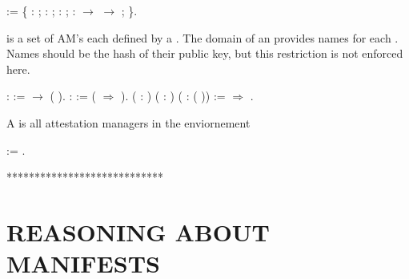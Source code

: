 \documentclass[12pt]{report}
\begin{document}
\begin{coqdoccode}
\coqdocnoindent
{}  := \{\coqdoceol
\coqdocnoindent
\coqdoceol
\coqdocindent{1.50em}
 :   ;\coqdoceol
\coqdocindent{1.50em}
 :   ; \coqdoceol
\coqdocindent{1.50em}
 :   ; \coqdoceol
\coqdocindent{1.50em}
 :  \ensuremath{\rightarrow}  \ensuremath{\rightarrow}  ;\coqdoceol
\coqdocnoindent
\coqdoceol
\coqdocnoindent
\coqdoceol
\coqdocindent{0.50em}
\}.\coqdoceol
\coqdocemptyline
\end{coqdoccode}
 is a set of AM's each defined by a .
  The domain of an  provides names for each .
  Names should be the hash of their public key, but this restriction
  is not enforced here. 

\begin{coqdoccode}
\coqdocemptyline
\coqdocnoindent
{}  :  :=   \ensuremath{\rightarrow} ( ).\coqdoceol
\coqdocemptyline
\coqdocnoindent
{}  :  := ( \coqdocvar{\_} \ensuremath{\Rightarrow} ).\coqdoceol
\coqdocemptyline
\coqdocnoindent
{}  ( : ) ( : ) ( : ( )) :=\coqdoceol
\coqdocindent{2.00em}
  \ensuremath{\Rightarrow}         .\coqdoceol
\coqdocemptyline
\end{coqdoccode}
A  is all attestation managers in the enviornement 
\begin{coqdoccode}
\coqdocemptyline
\coqdocnoindent
{}  :=  .\coqdoceol
\coqdocemptyline
\end{coqdoccode}
****************************
\section{REASONING ABOUT MANIFESTS}
\end{document}
